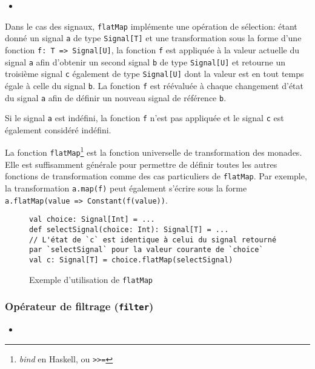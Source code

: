 \begin{itemize}
	\item {}
\end{itemize}

Dans le cas des signaux, \texttt{flatMap} implémente une opération de sélection: étant donné un signal \texttt{a} de type \texttt{Signal[T]} et une transformation sous la forme d'une fonction \texttt{f: T => Signal[U]}, la fonction \texttt{f} est appliquée à la valeur actuelle du signal \texttt{a} afin d'obtenir un second signal \texttt{b} de type \texttt{Signal[U]} et retourne un troisième signal \texttt{c} également de type \texttt{Signal[U]} dont la valeur est en tout temps égale à celle du signal \texttt{b}. La fonction \texttt{f} est réévaluée à chaque changement d'état du signal \texttt{a} afin de définir un nouveau signal de référence \texttt{b}.

Si le signal \texttt{a} est indéfini, la fonction \texttt{f} n'est pas appliquée et le signal \texttt{c} est également considéré indéfini.

La fonction \texttt{flatMap}\footnote{\emph{bind} en Haskell, ou \texttt{>>=}} est la fonction universelle de transformation des monades. Elle est suffisamment générale pour permettre de définir toutes les autres fonctions de transformation comme des cas particuliers de \texttt{flatMap}. Par exemple, la transformation \texttt{a.map(f)} peut également s'écrire  sous la forme \texttt{a.flatMap(value => Constant(f(value))}.

\begin{figure}[h]
	\begin{lstlisting}
val choice: Signal[Int] = ...
def selectSignal(choice: Int): Signal[T] = ...
// L'état de `c` est identique à celui du signal retourné par `selectSignal` pour la valeur courante de `choice`
val c: Signal[T] = choice.flatMap(selectSignal)
	\end{lstlisting}
	\caption{Exemple d'utilisation de \texttt{flatMap}}
\end{figure}

\subsubsection{Opérateur de filtrage (\texttt{filter})}

\begin{itemize}
	\item {}
\end{itemize}

